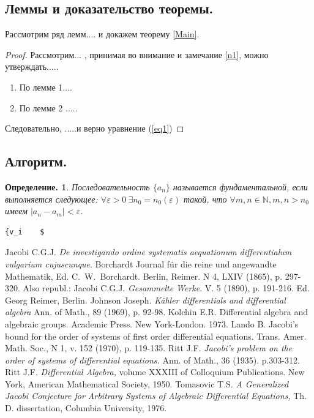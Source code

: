\documentclass{article}
\newtheorem{defi}{Определение.}
\theoremstyle{remark}
\begin{document}
\subsection{ Леммы и доказательство теоремы.}
 Рассмотрим ряд лемм....
и докажем  теорему \ref{Main}.
\begin{proof} Рассмотрим... , 
принимая во внимание  \cite{Jo1} и  замечание
\ref{n1},
можно утверждать.....

\begin{enumerate}
\item   По лемме 1....
\item   По лемме 2 .....
\end{enumerate}
Следовательно,  .....и верно уравнение (\ref{eq1})
\end{proof}

\subsection{Алгоритм.}

\begin{defi}
Последовательность $\{a_n\}$ называется фундаментальной,
если выполняется следующее:
 $\forall\varepsilon>0\ \exists n_0=n_0(\varepsilon)$ 
такой, что
\(\forall m,n\in {\mathbb N}, m,n>n_0\) имеем \(|a_n-a_m|<\varepsilon\). 
\end{defi}

\begin{verbatim}
{v_i    $
\end{verbatim}

\begin{thebibliography}{}
Jacobi C.G.J. 
{\it De
    investigando ordine systematis aequationum differentialum
    vulgarium cujuscunque}.
Borchardt Journal f{\"u}r die reine und angewandte Mathematik,
 Ed. C.~W.~Borchardt. Berlin,
    Reimer.
N 4, LXIV (1865), p. 297-320.
Also republ.:
Jacobi C.G.J. 
 {\it Gesammelte Werke}.
V. 5      (1890),
  p. 191-216.
 Ed. Georg Reimer,
Berlin.
 Johnson Joseph.  {\it K\"ahler differentials and differential algebra} 
Ann. of Math., 89 (1969), p. 92-98.
 Kolchin E.R. Differential algebra and algebraic groups. Academic Press. New York-London. 1973.
 Lando B. {Jacobi's bound for the order of systems of first order   differential equations. }
Trans. Amer. Math. Soc., N 1, v. 152 (1970), p. 119-135. 
 Ritt J.F. {\it Jacobi's problem on the order of systems of differential equations.} Ann. of Math., 36 (1935). p.303-312.
 Ritt J.F.  {\it Differential Algebra,} volume XXXIII of
Colloquium
Publications. New York, American Mathematical Society, 1950.
 Tomasovic T.S. {\it A Generalized Jacobi Conjecture
for Arbitrary Systems of Algebraic Differential Equations,} Th. D. dissertation, 
Columbia University, 1976.
\end{thebibliography}
\end{document}
